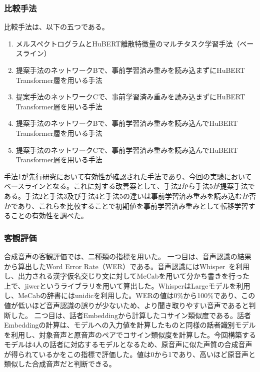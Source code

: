 \documentclass[12pt]{jarticle}
\numberwithin{equation}{section}    %
\numberwithin{figure}{section}      %
\numberwithin{table}{section}      %
\begin{document}
\subsubsection{比較手法}
\label{sec4:subsubsection:methods}
比較手法は、以下の五つである。
\begin{enumerate}
    \item メルスペクトログラムとHuBERT離散特徴量のマルチタスク学習手法（ベースライン）
    \item 提案手法のネットワークBで、事前学習済み重みを読み込まずにHuBERT Transformer層を用いる手法
    \item 提案手法のネットワークCで、事前学習済み重みを読み込まずにHuBERT Transformer層を用いる手法
    \item 提案手法のネットワークBで、事前学習済み重みを読み込んでHuBERT Transformer層を用いる手法
    \item 提案手法のネットワークCで、事前学習済み重みを読み込んでHuBERT Transformer層を用いる手法
\end{enumerate}
手法1が先行研究において有効性が確認された手法であり、今回の実験においてベースラインとなる。これに対する改善案として、手法2から手法5が提案手法である。手法2と手法3及び手法4と手法5の違いは事前学習済み重みを読み込むか否かであり、これらを比較することで初期値を事前学習済み重みとして転移学習することの有効性を調べた。

\subsubsection{客観評価}
合成音声の客観評価では、二種類の指標を用いた。
一つ目は、音声認識の結果から算出したWord Error Rate（WER）である。音声認識にはWhisper~\cite{radford2023robust}を利用し、出力される漢字仮名交じり文に対してMeCabを用いて分かち書きを行った上で、jiwerというライブラリを用いて算出した。WhisperはLargeモデルを利用し、MeCabの辞書にはunidicを利用した。WERの値は0\%から100\%であり、この値が低いほど音声認識の誤りが少ないため、より聞き取りやすい音声であると判断した。
二つ目は、話者Embeddingから計算したコサイン類似度である。話者Embeddingの計算は、モデルへの入力値を計算したものと同様の話者識別モデルを利用し、対象音声と原音声のペアでコサイン類似度を計算した。今回構築するモデルは4人の話者に対応するモデルとなるため、原音声に似た声質の合成音声が得られているかをこの指標で評価した。値は0から1であり、高いほど原音声と類似した合成音声だと判断できる。
\end{document}
